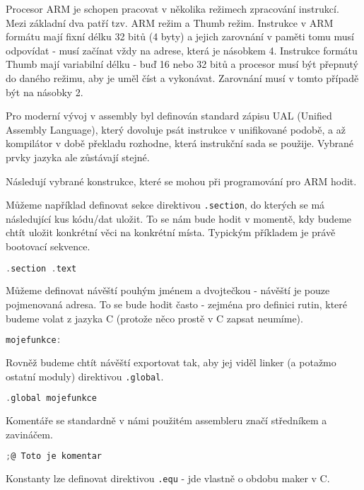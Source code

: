 \documentclass{article}
\begin{document}
Procesor ARM je schopen pracovat v několika režimech zpracování instrukcí. Mezi základní dva patří tzv. ARM režim a Thumb režim. Instrukce v ARM formátu mají fixní délku 32 bitů (4 byty) a jejich zarovnání v paměti tomu musí odpovídat - musí začínat vždy na adrese, která je násobkem 4. Instrukce formátu Thumb mají variabilní délku - buď 16 nebo 32 bitů a procesor musí být přepnutý do daného režimu, aby je uměl číst a vykonávat. Zarovnání musí v tomto případě být na násobky 2.

Pro moderní vývoj v assembly byl definován standard zápisu UAL (Unified Assembly Language), který dovoluje psát instrukce v unifikované podobě, a až kompilátor v době překladu rozhodne, která instrukční sada se použije. Vybrané prvky jazyka ale zůstávají stejné.

Následují vybrané konstrukce, které se mohou při programování pro ARM hodit.

Můžeme například definovat sekce direktivou \texttt{.section}, do kterých se má následující kus kódu/dat uložit. To se nám bude hodit v momentě, kdy budeme chtít uložit konkrétní věci na konkrétní místa. Typickým příkladem je právě bootovací sekvence.

\begin{lstlisting}[language=C]
.section .text
\end{lstlisting}

Můžeme definovat návěští pouhým jménem a dvojtečkou - návěští je pouze pojmenovaná adresa. To se bude hodit často - zejména pro definici rutin, které budeme volat z jazyka C (protože něco prostě v C zapsat neumíme).

\begin{lstlisting}[language=C]
mojefunkce:
\end{lstlisting}

Rovněž budeme chtít návěští exportovat tak, aby jej viděl linker (a potažmo ostatní moduly) direktivou \texttt{.global}.

\begin{lstlisting}[language=C]
.global mojefunkce
\end{lstlisting}

Komentáře se standardně v námi použitém assembleru značí středníkem a zavináčem.

\begin{lstlisting}[language=C]
;@ Toto je komentar
\end{lstlisting}

Konstanty lze definovat direktivou \texttt{.equ} - jde vlastně o obdobu maker v C.
\end{document}
